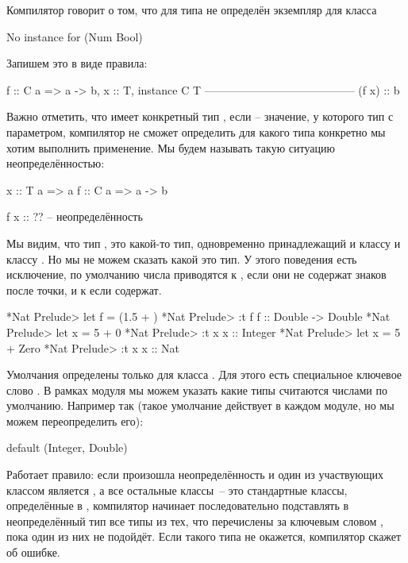 Компилятор говорит о том, что для типа  не  
определён экземпляр для класса 

\begin{code}
No instance for (Num Bool) 
\end{code}

Запишем это в виде правила:

\begin{code}
                    f :: C a => a -> b,  x :: T, instance C T 
                    -----------------------------------------
                                (f x) :: b
\end{code}

Важно отметить, что  имеет конкретный тип , 
если  -- значение, у которого тип с параметром, компилятор не сможет
определить для какого типа конкретно мы хотим выполнить применение. 
Мы будем называть такую ситуацию неопределённостью:

\begin{code}
x :: T a => a
f :: C a => a -> b

f x :: ??  -- неопределённость
\end{code}

Мы видим, что тип , это какой-то тип, одновременно принадлежащий
и классу  и классу . Но мы не можем сказать какой это
тип. У этого поведения есть исключение, по умолчанию 
числа приводятся к , если они не содержат знаков после точки,
и к  если содержат.

\begin{code}
*Nat Prelude> let f = (1.5 + )
*Nat Prelude> :t f
f :: Double -> Double
*Nat Prelude> let x = 5 + 0
*Nat Prelude> :t x
x :: Integer
*Nat Prelude> let x = 5 + Zero
*Nat Prelude> :t x
x :: Nat
\end{code}

Умолчания определены только для класса . Для этого
есть специальное ключевое слово . 
В рамках модуля мы можем указать какие типы считаются
числами по умолчанию. Например так (такое умолчание действует
в каждом модуле, но мы можем переопределить его):

\begin{code}
default (Integer, Double)
\end{code}

Работает правило: если произошла неопределённость и один 
из участвующих классом является , а все остальные
классы~-- это стандартные классы, определённые в ,
компилятор начинает последовательно подставлять в неопределённый
тип все типы из тех, что перечислены за ключевым словом ,
пока один из них не подойдёт. Если такого типа не окажется, 
компилятор скажет об ошибке. 

